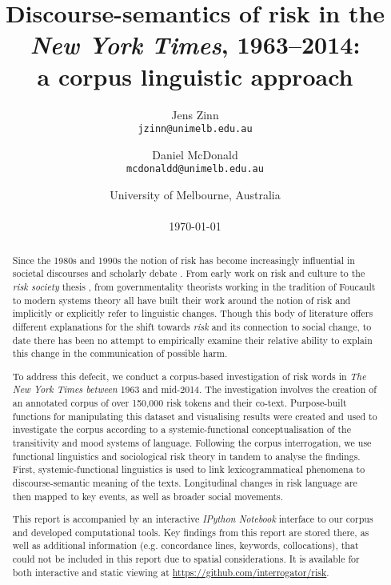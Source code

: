 \documentclass{report}
\title{Discourse-semantics of risk in the \emph{New York Times}, 1963--2014: \\ a corpus linguistic approach}
\author{
    Jens Zinn\\
    \texttt{jzinn@unimelb.edu.au}
    \and
    Daniel McDonald\\
    \texttt{mcdonaldd@unimelb.edu.au}\\
    }
\date{University of Melbourne, Australia\\
    ~\\
    \today}
\begin{document}
        

    \renewcommand{\abstractname}{Abstract}

    \maketitle

\begin{abstract}

    Since the 1980s and 1990s the notion of risk has become increasingly influential in societal discourses and scholarly debate \cite{skolbekken_risk_1995}. From early work on risk and culture \cite{douglas_risk_1986,douglas_risk_2013} to the \emph{risk society} thesis \cite{beck_risk_1992,beck_world_2009,giddens_runaway_2002}, from governmentality theorists working in the tradition of Foucault \cite{dean_governmentality:_2010,omalley_risk_2012,rose_powers_1999} to modern systems theory \cite{luhmann_ecological_1989,luhmann_communication_1993} all have built their work around the notion of risk and implicitly or explicitly refer to linguistic changes. Though this body of literature offers different explanations for the shift towards \emph{risk} and its connection to social change, to date there has been no attempt to empirically examine their relative ability to explain this change in the communication of possible harm. 


    To address this defecit, we conduct a corpus-based investigation of risk words in \emph{The New York Times between} 1963 and mid-2014. The investigation involves the creation of an annotated corpus of over 150,000 risk tokens and their co-text. Purpose-built functions for manipulating this dataset and visualising results were created and used to investigate the corpus according to a systemic-functional conceptualisation of the transitivity and mood systems of language. Following the corpus interrogation, we use functional linguistics and sociological risk theory in tandem to analyse the findings. First, systemic-functional linguistics is used to link lexicogrammatical phenomena to discourse-semantic meaning of the texts. Longitudinal changes in risk language are then mapped to key events, as well as broader social movements.

    This report is accompanied by an interactive \emph{IPython Notebook} interface to our corpus and developed computational tools. Key findings from this report are stored there, as well as additional information (e.g. concordance lines, keywords, collocations), that could not be included in this report due to spatial considerations. It is available for both interactive and static viewing at \url{https://github.com/interrogator/risk}.

    \end{abstract}
\end{document}
